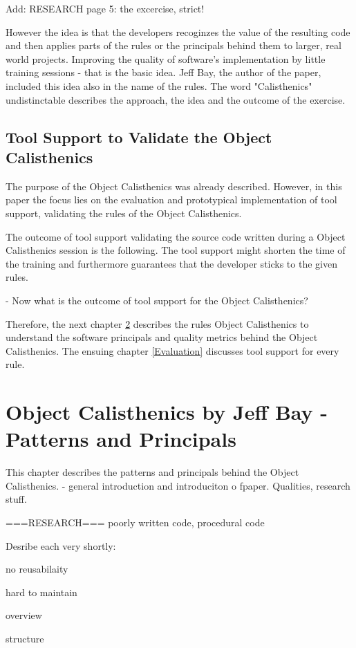 Add: RESEARCH page 5: the excercise, strict!

However the idea is that the developers recoginzes the value of the resulting code and then applies parts of the rules or the principals behind them to larger, real world projects. 
Improving the quality of software's implementation by little training sessions - that is the basic idea. Jeff Bay, the author of the paper, included this idea also in the name of the rules. The word "Calisthenics" undistinctable describes the approach, the idea and the outcome of the exercise.

\section{Tool Support to Validate the Object Calisthenics}
The purpose of the Object Calisthenics was already described. However, in this paper the focus lies on the evaluation and prototypical implementation of tool support, validating the rules of the Object Calisthenics. 

The outcome of tool support validating the source code written during a Object Calisthenics session is the following. The tool support might shorten the time of the training and furthermore guarantees that the developer sticks to the given rules. 

- Now what is the outcome of tool support for the Object Calisthenics?

Therefore, the next chapter  \ref{Description} describes the rules Object Calisthenics to understand the software principals and quality metrics behind the Object Calisthenics. 
The ensuing chapter \ref{Evaluation} discusses tool support for every rule. 

\chapter{Object Calisthenics by Jeff Bay - Patterns and Principals}
\label{Description}
This chapter describes the patterns and principals behind the Object Calisthenics. 
- general introduction and introduciton o fpaper. Qualities, research stuff.

===RESEARCH===
poorly written code, procedural code

Desribe each very shortly: 

no reusabilaity

hard to maintain

overview

structure

